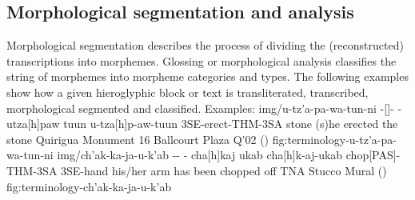 \documentclass[../main.tex]{subfiles}
\begin{document}
\subsection{Morphological segmentation and analysis}
Morphological segmentation describes the process of dividing the (reconstructed) transcriptions into
morphemes.
Glossing or morphological analysis classifies the string of morphemes into morpheme categories 
and types.
The following examples show how a given hieroglyphic block or text is transliterated, transcribed,
morphological segmented and classified.
\newline
Examples:
\glyphanalysis
    {img/u-tz'a-pa-wa-tun-ni}
    {-[]- 
    -}
    {utz\glottalstop{}a[h]paw tuun}
    {u-tz\glottalstop{}a[h]p-aw-\zeromorpheme tuun}
    {3SE-erect-THM-3SA stone}
    {(s)he erected the stone}
    {Quirigua Monument 16 Ballcourt Plaza Q'02 (\authordrawings)}
    {fig:terminology-u-tz'a-pa-wa-tun-ni}
\glyphanalysis
    {img/ch'ak-ka-ja-u-k'ab}
    {--
    -}
    {ch\glottalstop{}a[h]kaj uk\glottalstop{}ab}
    {ch\glottalstop{}a[h]k-aj-\zeromorpheme uk\glottalstop{}ab}
    {chop[PAS]-THM-3SA 3SE-hand}
    {his/her arm has been chopped off}
    {TNA Stucco Mural (\authordrawings)}
    {fig:terminology-ch'ak-ka-ja-u-k'ab}
\end{document}

